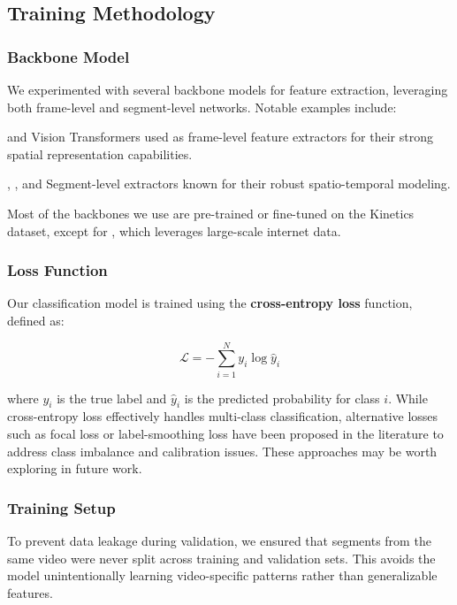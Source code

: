 
\subsection{Training Methodology}

\subsubsection*{Backbone Model}
We experimented with several backbone models for feature extraction, leveraging both frame-level and segment-level networks. Notable examples include:

 and  Vision Transformers used as frame-level feature extractors for their strong spatial representation capabilities.

, , and  Segment-level extractors known for their robust spatio-temporal modeling.

Most of the backbones we use are pre-trained or fine-tuned on the Kinetics dataset, except for , which leverages large-scale internet data.

\subsubsection*{Loss Function}
Our classification model is trained using the \textbf{cross-entropy loss} function, defined as:

\[
\mathcal{L} = -\sum_{i=1}^{N} y_i \log \hat{y}_i
\]

where \(y_i\) is the true label and \(\hat{y}_i\) is the predicted probability for class \(i\). While cross-entropy loss effectively handles multi-class classification, alternative losses such as focal loss or label-smoothing loss have been proposed in the literature to address class imbalance and calibration issues. These approaches may be worth exploring in future work.

\subsubsection*{Training Setup}

To prevent data leakage during validation, we ensured that segments from the same video were never split across training and validation sets. This avoids the model unintentionally learning video-specific patterns rather than generalizable features.

